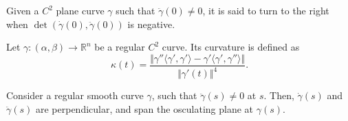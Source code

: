 \documentclass[11pt]{article}
\newcommand{\R}{\mathbb{R}}
\newcommand{\ip}[2]{\langle #1, #2 \rangle}
\newcommand{\norm}[1]{\Vert #1 \Vert}
\theoremstyle{definition}
\theoremstyle{remark}
\numberwithin{equation}{section}
\begin{document}
    \begin{definition}
        Given a $C^2$ plane curve $\gamma$ such that $\ddot{\gamma}(0) \neq 0$, it is
        said to turn to the right when $\det(\dot{\gamma}(0), \ddot{\gamma}(0))$ is
        negative.
    \end{definition}
    
    \begin{definition}
        Let $\gamma\colon (\alpha, \beta) \to \R^n$ be a regular $C^2$ curve. Its
        curvature is defined as \[
            \kappa(t) = \frac{\norm{\gamma''\ip{\gamma'}{\gamma'} -
            \gamma'\ip{\gamma'}{\gamma''}}}{\norm{\gamma'(t)}^4}.
        \] 
    \end{definition}

    \begin{definition}
        Consider a regular smooth curve $\gamma$, such that $\ddot{\gamma}(s) \neq 0$ at
        $s$. Then, $\dot{\gamma}(s)$ and $\ddot{\gamma}(s)$ are perpendicular, and
        span the osculating plane at $\gamma(s)$.
    \end{definition}
\end{document}
